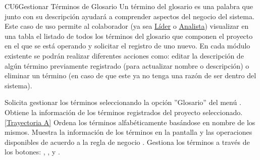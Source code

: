 	\begin{UseCase}{CU6}{Gestionar Términos de Glosario}{
	Un término del glosario es una palabra que junto con su descripción ayudará a comprender  aspectos del negocio del sistema.\\
	
	Este caso de uso permite al colaborador (ya sea \hyperlink{jefe}{Líder} o \hyperlink{analista}{Analista}) visualizar en una tabla el listado de  todos los términos del glosario que componen el proyecto en el que se está operando y solicitar el registro de uno nuevo. En cada módulo existente se podrán realizar diferentes acciones como: editar la descripción de algún término previamente registrado (para actualizar nombre o descripción) o eliminar un término (en caso de que este ya no tenga una razón de ser dentro del sistema).\\
	}
	
\end{UseCase}
\begin{UCtrayectoria}
	\UCpaso[\UCactor] Solicita gestionar los términos seleccionando la opción ''Glosario'' del menú .
	\UCpaso[\UCsist] Obtiene la información de los términos registrados del proyecto seleccionado. \hyperlink{CU6:TAA}{[Trayectoria A]}
	\UCpaso[\UCsist] Ordena los términos alfabéticamente basándose en nombre de los mismos.
	\UCpaso[\UCsist] Muestra la información de los términos en la pantalla  y las operaciones disponibles de acuerdo a la regla de negocio .\label{CU6-P4}
	\UCpaso[\UCactor] Gestiona los términos a través de los botones: , \editar, \eliminar y . 
\end{UCtrayectoria}		
